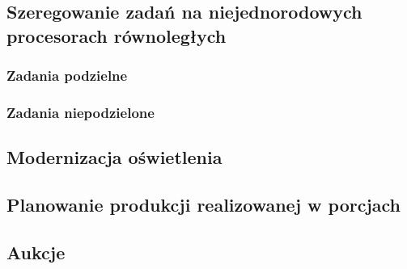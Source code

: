 \documentclass[
    12pt, %
]{../fphw}
\begin{document}
\subsection{Szeregowanie zadań na niejednorodowych procesorach równoległych}
\subsubsection{Zadania podzielne}
\subsubsection{Zadania niepodzielone}

\subsection{Modernizacja oświetlenia}
\subsection{Planowanie produkcji realizowanej w porcjach}
\subsection{Aukcje}
\end{document}
